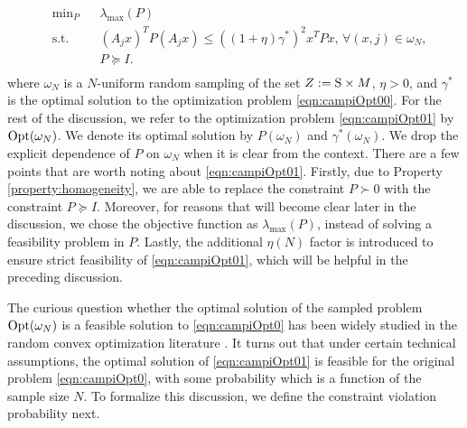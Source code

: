 \begin{equation}\label{eqn:campiOpt01}
\begin{aligned}
& \text{min}_{P} & & \lambda_{\max}(P) \\
& \text{s.t.} 
&  & (A_j x)^TP(A_j x) \leq {((1 +\eta)\gamma^*)}^2 x^TPx,\,\forall (x, j) \in \omega_N, \\
& && P \succeq I. \\
\end{aligned}
\end{equation}
where $\omega_N$ is a $N$-uniform random sampling of the set \mbox{$Z:=\text{S} \times M$}, $\eta > 0$, and $\gamma^*$ is the optimal solution to the optimization problem \eqref{eqn:campiOpt00}. For the rest of the discussion, we refer to the optimization problem \eqref{eqn:campiOpt01} by $ \text{Opt}(\omega_N)$. We denote its optimal solution by $P(\omega_N)$ and $\gamma^*(\omega_N)$. We drop the explicit dependence of $P$ on $\omega_N$ when it is clear from the context. There are a few points that are worth noting about \eqref{eqn:campiOpt01}. Firstly, due to Property \ref{property:homogeneity}, we are able to replace the constraint $P \succ 0$ with the constraint $P \succeq I$. Moreover, for reasons that will become clear later in the discussion, we chose the objective function as $\lambda_{\max}(P)$, instead of solving a feasibility problem in $P$. Lastly, the additional $\eta(N)$ factor is introduced to ensure strict feasibility of \eqref{eqn:campiOpt01}, which will be helpful in the preceding discussion.

The curious question whether the optimal solution of the sampled problem $\text{Opt}(\omega_N)$ is a feasible solution to \eqref{eqn:campiOpt0} has been widely studied in the random convex optimization literature \cite{campi}. It turns out that under certain technical assumptions, the optimal solution of \eqref{eqn:campiOpt01} is feasible for the original problem \eqref{eqn:campiOpt0}, with some probability which is a function of the sample size $N$. To formalize this discussion, we define the constraint violation probability next.

